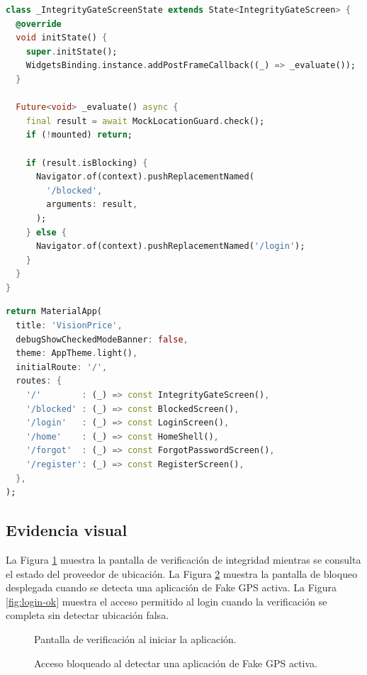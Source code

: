 \documentclass[12pt, a4paper]{article}
\begin{document}
\begin{lstlisting}[language=Dart, caption={Pantalla de integridad (splash) que evalúa al iniciar}, label={lst:gate}]
class _IntegrityGateScreenState extends State<IntegrityGateScreen> {
  @override
  void initState() {
    super.initState();
    WidgetsBinding.instance.addPostFrameCallback((_) => _evaluate());
  }

  Future<void> _evaluate() async {
    final result = await MockLocationGuard.check();
    if (!mounted) return;

    if (result.isBlocking) {
      Navigator.of(context).pushReplacementNamed(
        '/blocked',
        arguments: result,
      );
    } else {
      Navigator.of(context).pushReplacementNamed('/login');
    }
  }
}
\end{lstlisting}

\begin{lstlisting}[language=Dart, caption={Registro de rutas con el gate como punto de entrada}, label={lst:main}]
return MaterialApp(
  title: 'VisionPrice',
  debugShowCheckedModeBanner: false,
  theme: AppTheme.light(),
  initialRoute: '/',
  routes: {
    '/'        : (_) => const IntegrityGateScreen(),
    '/blocked' : (_) => const BlockedScreen(),
    '/login'   : (_) => const LoginScreen(),
    '/home'    : (_) => const HomeShell(),
    '/forgot'  : (_) => const ForgotPasswordScreen(),
    '/register': (_) => const RegisterScreen(),
  },
);
\end{lstlisting}

\subsection{Evidencia visual}
La Figura \ref{fig:gate} muestra la pantalla de verificación de
integridad mientras se consulta el estado del proveedor de ubicación.
La Figura \ref{fig:bloqueo-fake} muestra la pantalla de bloqueo
desplegada cuando se detecta una aplicación de Fake GPS activa.
La Figura \ref{fig:login-ok} muestra el acceso permitido al login
cuando la verificación se completa sin detectar ubicación falsa.

\begin{figure}[h]
    \centering
    \caption{Pantalla de verificación al iniciar la aplicación.}
    \label{fig:gate}
\end{figure}

\begin{figure}[h]
    \centering
    \caption{Acceso bloqueado al detectar una aplicación de Fake GPS activa.}
    \label{fig:bloqueo-fake}
\end{figure}
\end{document}
